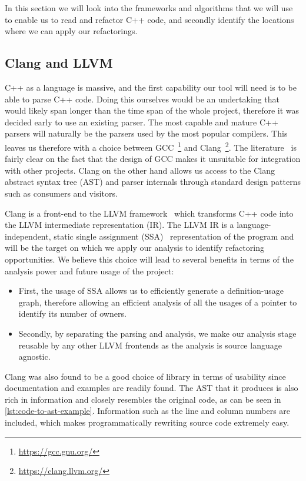 \documentclass{proposal}
\begin{document}
    In this section we will look into the frameworks and algorithms that we will use to enable us to read and refactor C++ code, and secondly identify the locations where we can apply our refactorings.

    \subsection{Clang and LLVM}\label{subsec:clang-and-llvm}

    C++ as a language is massive, and the first capability our tool will need is to be able to parse C++ code.
    Doing this ourselves would be an undertaking that would likely span longer than the time span of the whole project, therefore it was decided early to use an existing parser.
    The most capable and mature C++ parsers will naturally be the parsers used by the most popular compilers.
    This leaves us therefore with a choice between GCC~\footnote{\url{https://gcc.gnu.org/}} and Clang~\footnote{\url{https://clang.llvm.org/}}.
    The literature~\cite{Duffy2014} is fairly clear on the fact that the design of GCC makes it unsuitable for integration with other projects.
    Clang on the other hand allows us access to the Clang abstract syntax tree (AST) and parser internals through standard design patterns such as consumers and visitors.

    Clang is a front-end to the LLVM framework~\cite{Lattner2004} which transforms C++ code into the LLVM intermediate representation (IR).
    The LLVM IR is a language-independent, static single assignment (SSA)~\cite{Rosen1988} representation of the program and will be the target on which we apply our analysis to identify refactoring opportunities.
    We believe this choice will lead to several benefits in terms of the analysis power and future usage of the project:
    \begin{itemize}
        \item First, the usage of SSA allows us to efficiently generate a definition-usage graph, therefore allowing an efficient analysis of all the usages of a pointer to identify its number of owners.
        \item Secondly, by separating the parsing and analysis, we make our analysis stage reusable by any other LLVM frontends as the analysis is source language agnostic.
    \end{itemize}

    Clang was also found to be a good choice of library in terms of usability since documentation and examples are readily found.
    The AST that it produces is also rich in information and closely resembles the original code, as can be seen in \autoref{lst:code-to-ast-example}.
    Information such as the line and column numbers are included, which makes programmatically rewriting source code extremely easy.
\end{document}

